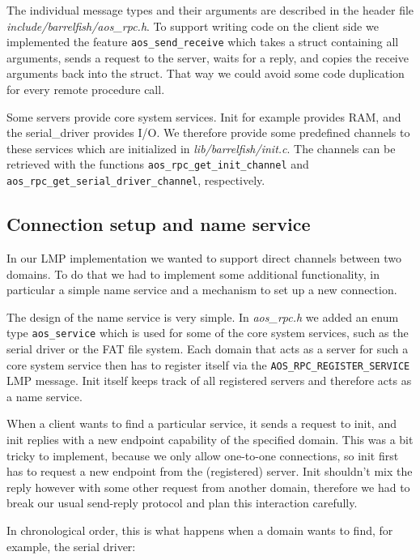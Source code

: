 \documentclass[a4paper,10pt]{article}
\newcommand{\filepath}[1]{\emph{ #1}}
\begin{document}
The individual message types and their arguments are described in the header file \filepath{include/barrelfish/aos\_rpc.h}.
To support writing code on the client side we implemented the feature \lstinline!aos_send_receive! which takes a struct containing all arguments, 
sends a request to the server, waits for a reply, and copies the receive arguments back into the struct.
That way we could avoid some code duplication for every remote procedure call.

Some servers provide core system services. Init for example provides RAM, and the serial\_driver provides I/O.
We therefore provide some predefined channels to these services which are initialized in \filepath{lib/barrelfish/init.c}.
The channels can be retrieved with the functions \lstinline!aos_rpc_get_init_channel! and \lstinline!aos_rpc_get_serial_driver_channel!, respectively.

\subsection{Connection setup and name service}

In our LMP implementation we wanted to support direct channels between two domains.
To do that we had to implement some additional functionality, in particular a simple name service and a mechanism to set up a new connection.

The design of the name service is very simple.
In \filepath{aos\_rpc.h} we added an enum type \lstinline!aos_service! which is used for some of the core system services, such as the serial driver or the FAT file system.
Each domain that acts as a server for such a core system service then has to register itself via the \lstinline!AOS_RPC_REGISTER_SERVICE! LMP message.
Init itself keeps track of all registered servers and therefore acts as a name service.

When a client wants to find a particular service, it sends a request to init, and init replies with a new endpoint capability of the specified domain.
This was a bit tricky to implement, because we only allow one-to-one connections, so init first has to request a new endpoint from the (registered) server.
Init shouldn't mix the reply however with some other request from another domain, therefore we had to break our usual send-reply protocol and plan this interaction carefully.

In chronological order, this is what happens when a domain wants to find, for example, the serial driver:
\end{document}
